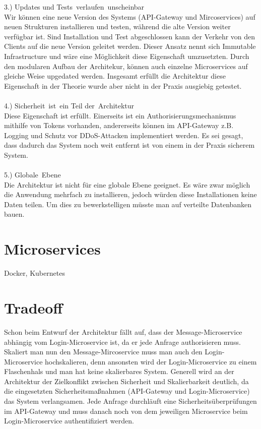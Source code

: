 3.) Updates und Tests verlaufen unscheinbar\\
Wir können eine neue Version des Systems (API-Gateway und Mircoservices) auf neuen Strukturen installieren und testen, während die alte Version weiter verfügbar ist. Sind Installation und Test abgeschlossen kann der Verkehr von den Clients auf die neue Version geleitet werden. Dieser Ansatz nennt sich Immutable Infrastructure und wäre eine Möglichkeit diese Eigenschaft umzusetzten. Durch den modularen Aufbau der Architekur, können auch einzelne Microservices auf gleiche Weise upgedated werden. Insgesamt erfüllt die Architektur diese Eigenschaft in der Theorie wurde aber nicht in der Praxis ausgiebig getestet.\\
\\
4.) Sicherheit ist ein Teil der Architektur\\
Diese Eigenschaft ist erfüllt. Einerseits ist ein Authorisierungsmechanismus mithilfe von Tokens vorhanden, andererseits können im API-Gateway z.B. Logging und Schutz vor DDoS-Attacken implementiert werden. Es sei gesagt, dass dadurch das System noch weit entfernt ist von einem in der Praxis sicherem System.\\
\\
5.) Globale Ebene\\
Die Architektur ist nicht für eine globale Ebene geeignet. Es wäre zwar möglich die Anwendung mehrfach zu installieren, jedoch würden diese Installationen keine Daten teilen. Um dies zu bewerkstelligen müsste man auf verteilte Datenbanken bauen.

\section{Microservices}
 Docker, Kubernetes
 
\section{Tradeoff}
\label{tradeoff}
Schon beim Entwurf der Architektur fällt auf, dass der Message-Microservice abhängig vom Login-Microservice ist, da er jede Anfrage authorisieren muss. Skaliert man nun den Message-Mircoservice muss man auch den Login-Microservice hochskalieren, denn ansonsten wird der Login-Microservice zu einem Flaschenhals und man hat keine skalierbares System. Generell wird an der Architektur der Zielkonflikt zwischen Sicherheit und Skalierbarkeit deutlich, da die eingesetzten Sicherheitsmaßnahmen (API-Gateway und Login-Microservice) das System verlangsamen. Jede Anfrage durchläuft eine Sicherheitsüberprüfungen im API-Gateway und muss danach noch von dem jeweiligen Microservice beim Login-Microservice authentifiziert werden.


